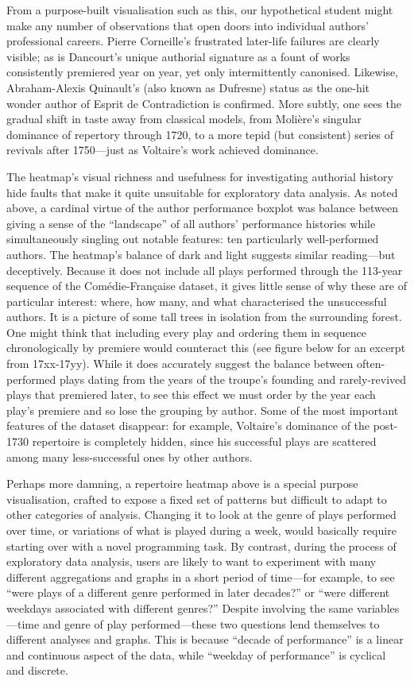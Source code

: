 \documentclass[	DIV=calc,%
							paper=a4,%
							fontsize=11pt,%
							twocolumn]{scrartcl}	 					%
\begin{document}
From a purpose-built visualisation such as this, our hypothetical student might make any number of observations that open doors into individual authors’ professional careers.  Pierre Corneille’s frustrated later-life failures are clearly visible; as is Dancourt’s unique authorial signature as a fount of works consistently premiered year on year, yet only intermittently canonised.  Likewise, Abraham-Alexis Quinault’s (also known as Dufresne) status as the one-hit wonder author of Esprit de Contradiction is confirmed.  More subtly, one sees the gradual shift in taste away from classical models, from Molière’s singular dominance of repertory through 1720, to a more tepid (but consistent) series of revivals after 1750—just as Voltaire’s work achieved dominance.

The heatmap’s visual richness and usefulness for investigating authorial history hide faults that make it quite unsuitable for exploratory data analysis.  As noted above, a cardinal virtue of the author performance boxplot was balance between giving a sense of the ``landscape'' of all authors’ performance histories while simultaneously singling out notable features: ten particularly well-performed authors.  The heatmap’s balance of dark and light suggests similar reading—but deceptively.  Because it does not include all plays performed through the 113-year sequence of the Comédie-Française dataset, it gives little sense of why these are of particular interest: where, how many, and what characterised the unsuccessful authors.  It is a picture of some tall trees in isolation from the surrounding forest.  One might think that including every play and ordering them in sequence chronologically by premiere would counteract this (see figure below for an excerpt from 17xx-17yy).  While it does accurately suggest the balance between often-performed plays dating from the years of the troupe’s founding and rarely-revived plays that premiered later, to see this effect we must order by the year each play’s premiere and so lose the grouping by author.  Some of the most important features of the dataset disappear: for example, Voltaire’s dominance of the post-1730 repertoire is completely hidden, since his successful plays are scattered among many less-successful ones by other authors.

Perhaps more damning, a repertoire heatmap above is a special purpose visualisation, crafted to expose a fixed set of patterns but difficult to adapt to other categories of analysis.  Changing it to look at the genre of plays performed over time, or variations of what is played during a week, would basically require starting over with a novel programming task.  By contrast, during the process of exploratory data analysis, users are likely to want to experiment with many different aggregations and graphs in a short period of time—for example, to see ``were plays of a different genre performed in later decades?'' or ``were different weekdays associated with different genres?''  Despite involving the same variables—time and genre of play performed—these two questions lend themselves to different analyses and graphs.  This is because ``decade of performance'' is a linear and continuous aspect of the data, while ``weekday of performance'' is cyclical and discrete.
\end{document}
